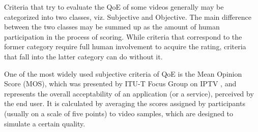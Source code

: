 Criteria that try to evaluate the QoE of some videos generally may be categorized into two classes, viz. Subjective and Objective. The main difference between the two classes may be summed up as the amount of human participation in the process of scoring. While criteria that correspond to the former category require full human involvement to acquire the rating, criteria that fall into the latter category can do without it.
 
One of the most widely used subjective criteria of QoE is the Mean Opinion Score (MOS), which was presented by ITU-T Focus Group on IPTV \cite{recommendation20081080}, and represents the overall acceptability of an application (or a service), perceived by the end user. It is calculated by averaging the scores assigned by participants (usually on a scale of five points) to video samples, which are designed to simulate a certain quality.

